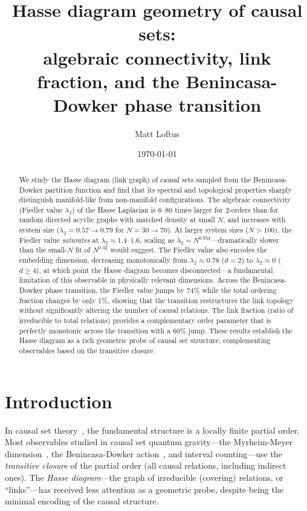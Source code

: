 \documentclass[aps,prd,twocolumn,superscriptaddress,nofootinbib]{revtex4-2}
\begin{document}
\title{Hasse diagram geometry of causal sets:\\algebraic connectivity, link fraction, and the Benincasa-Dowker phase transition}

\author{Matt Loftus}

\date{\today}

\begin{abstract}
We study the Hasse diagram (link graph) of causal sets sampled from the Benincasa-Dowker partition function and find that its spectral and topological properties sharply distinguish manifold-like from non-manifold configurations. The algebraic connectivity (Fiedler value $\lambda_2$) of the Hasse Laplacian is $6$--$80$ times larger for 2-orders than for random directed acyclic graphs with matched density at small $N$, and increases with system size ($\lambda_2 = 0.57 \to 0.79$ for $N = 30 \to 70$). At larger system sizes ($N > 100$), the Fiedler value \emph{saturates} at $\lambda_2 \approx 1.4$--$1.6$, scaling as $\lambda_2 \sim N^{0.054}$---dramatically slower than the small-$N$ fit of $N^{0.32}$ would suggest. The Fiedler value also encodes the embedding dimension, decreasing monotonically from $\lambda_2 \approx 0.78$ ($d=2$) to $\lambda_2 \approx 0$ ($d \geq 4$), at which point the Hasse diagram becomes disconnected---a fundamental limitation of this observable in physically relevant dimensions. Across the Benincasa-Dowker phase transition, the Fiedler value jumps by 74\% while the total ordering fraction changes by only 1\%, showing that the transition restructures the link topology without significantly altering the number of causal relations. The link fraction (ratio of irreducible to total relations) provides a complementary order parameter that is perfectly monotonic across the transition with a 60\% jump. These results establish the Hasse diagram as a rich geometric probe of causal set structure, complementing observables based on the transitive closure.
\end{abstract}

\maketitle

\section{Introduction}

In causal set theory~\cite{bombelli1987,surya2019}, the fundamental structure is a locally finite partial order. Most observables studied in causal set quantum gravity---the Myrheim-Meyer dimension~\cite{myrheim1978,meyer1988}, the Benincasa-Dowker action~\cite{benincasa2010}, and interval counting---use the \emph{transitive closure} of the partial order (all causal relations, including indirect ones). The \emph{Hasse diagram}---the graph of irreducible (covering) relations, or ``links''---has received less attention as a geometric probe, despite being the minimal encoding of the causal structure.
\end{document}
